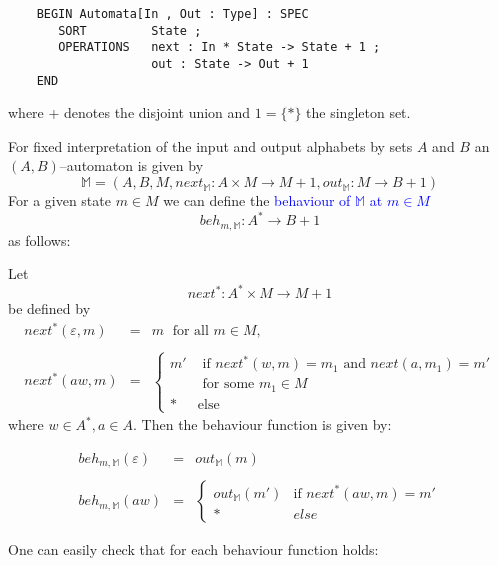 \documentclass[landscape, autoslides, light]{mmiss}
\newcommand{\ns}{\normalsize}
\begin{document}
\begin{Package}[Label={FSDPT}, Title={Formal Specification of Data and Process Types}, ShortTitle={FSDPT}, Authors={Horst Reichel}, Date={February 2003}, LevelOfDetail=Lecture, Language=en-GB]
\begin{Section}[Title={Introduction}, Label={section2}]
\begin{Paragraph}[Title={Basic Intuition - Finality}, Label=Paragraph16]
\small
\begin{verbatim}
    BEGIN Automata[In , Out : Type] : SPEC
       SORT         State ;
       OPERATIONS   next : In * State -> State + 1 ;
                    out : State -> Out + 1
    END
 \end{verbatim}
 \ns

 where + denotes the disjoint union and $1 = \{ * \}$ the singleton
 set.


\end{Paragraph}
\begin{Paragraph}[Title={Basic Intuition - Finality}, Label=Paragraph17]

For fixed interpretation of the input and output alphabets by sets
$A$ and $B$ an $(A, B)$--automaton is given by
$$ \mathbb{M} = (A, B, M, next_{\mathbb{M}}: A \times M \to M + 1,
out_{\mathbb{M}}: M \to B +1)$$ For a given state $m \in M$ we can
define the \textcolor{blue}{behaviour of $ \mathbb{M}$ at $m \in
M$} $$ beh_{m, \mathbb{M}} : A^* \to B + 1 $$ as follows:


Let $$ next^* : A^* \times M \to M +1 $$ be defined by
\small
$$\begin{array}{lll}next^*(\varepsilon, m)&  = &  m \; \mbox{ for
all } m \in M,\\ & & \\
 next^*(aw,m)&  = & \left\{ \begin{array}{ll}
 m' & \mbox{ if } next^*(w,m) = m_1 \mbox{ and } next(a,m_1) =
 m'\\  &
 \mbox{ for some } m_1 \in M \\
 \ast & \mbox{else} \end{array} \right .\end{array} $$
where $w \in A^*, a \in A$.
\ns
 Then the behaviour function is
given by:

$$\begin{array}{lll}
beh_{m,\mathbb{M}}(\varepsilon) & = & out_{\mathbb M}(m) \\
 &  &  \\
beh_{m,\mathbb{M}}(aw) & = & \left\{\begin{array}{ll} out_{\mathbb
M}(m') & \mbox{if } next^*(aw,m) = m' \\ \ast & else
\end{array} \right. \end{array}$$

One can easily check that for each behaviour function holds:


\end{Paragraph}
\end{Section}
\end{Package}
\end{document}
